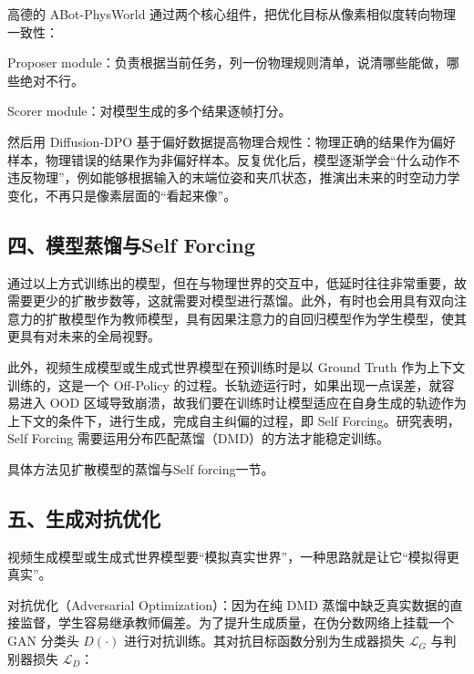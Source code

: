 高德的 ABot-PhysWorld 通过两个核心组件，把优化目标从像素相似度转向物理一致性：

Proposer module：负责根据当前任务，列一份物理规则清单，说清哪些能做，哪些绝对不行。

Scorer module：对模型生成的多个结果逐帧打分。

然后用 Diffusion-DPO 基于偏好数据提高物理合规性：物理正确的结果作为偏好样本，物理错误的结果作为非偏好样本。反复优化后，模型逐渐学会``什么动作不违反物理''，例如能够根据输入的末端位姿和夹爪状态，推演出未来的时空动力学变化，不再只是像素层面的``看起来像''。

\hypertarget{ux56dbux6a21ux578bux84b8ux998fux4e0eself-forcing}{%
\subsection{四、模型蒸馏与Self Forcing}\label{ux56dbux6a21ux578bux84b8ux998fux4e0eself-forcing}}

通过以上方式训练出的模型，但在与物理世界的交互中，低延时往往非常重要，故需要更少的扩散步数等，这就需要对模型进行蒸馏。此外，有时也会用具有双向注意力的扩散模型作为教师模型，具有因果注意力的自回归模型作为学生模型，使其更具有对未来的全局视野。

此外，视频生成模型或生成式世界模型在预训练时是以 Ground Truth 作为上下文训练的，这是一个 Off-Policy 的过程。长轨迹运行时，如果出现一点误差，就容易进入 OOD 区域导致崩溃，故我们要在训练时让模型适应在自身生成的轨迹作为上下文的条件下，进行生成，完成自主纠偏的过程，即 Self Forcing。研究表明，Self Forcing 需要运用分布匹配蒸馏（DMD）的方法才能稳定训练。

具体方法见扩散模型的蒸馏与Self forcing一节。

\hypertarget{ux4e94ux751fux6210ux5bf9ux6297ux4f18ux5316}{%
\subsection{五、生成对抗优化}\label{ux4e94ux751fux6210ux5bf9ux6297ux4f18ux5316}}

视频生成模型或生成式世界模型要``模拟真实世界''，一种思路就是让它``模拟得更真实''。

对抗优化（Adversarial Optimization）：因为在纯 DMD 蒸馏中缺乏真实数据的直接监督，学生容易继承教师偏差。为了提升生成质量，在伪分数网络上挂载一个 GAN 分类头 \(D(\cdot)\) 进行对抗训练。其对抗目标函数分别为生成器损失 \(\mathcal{L}_G\) 与判别器损失 \(\mathcal{L}_D\)：

